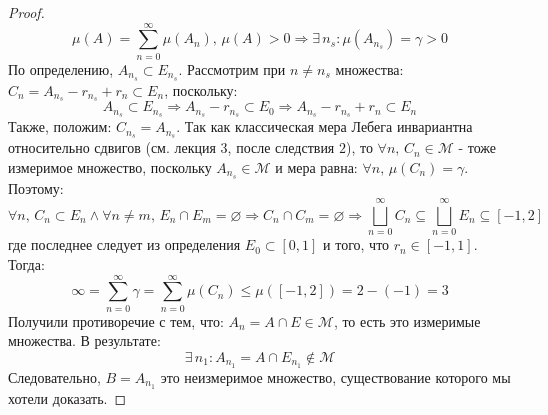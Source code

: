 \documentclass[12pt]{article}
\newcommand{\MM}{\mathcal{M}}
\newcommand{\VN}{\varnothing}
\theoremstyle{definition}
\newcommand{\ddsum}[2]{\displaystyle\sum\limits_{#1}^{#2}}
\begin{document}
\begin{proof}
	$$
		\mu(A) = \ddsum{n = 0}{\infty}\mu(A_n), \, \mu(A) > 0 \Rightarrow \exists \, n_s \colon \mu(A_{n_s}) = \gamma > 0
	$$
	По определению, $A_{n_s} \subset E_{n_s}$. Рассмотрим при $n \neq n_s$ множества: $C_n = A_{n_s} - r_{n_s} + r_n \subset E_n$, поскольку:
	$$
		A_{n_s} \subset E_{n_s} \Rightarrow A_{n_s} - r_{n_s} \subset E_0 \Rightarrow A_{n_s} - r_{n_s} + r_n \subset E_n
	$$
	Также, положим: $C_{n_s} = A_{n_s}$. Так как классическая мера Лебега инвариантна относительно сдвигов (см. лекция $3$, после следствия $2$), то $\forall n,\, C_n \in \MM$ - тоже измеримое множество, поскольку $A_{n_s} \in \MM$ и мера равна: $\forall n, \, \mu(C_n) = \gamma$. Поэтому:
	$$
		\forall n,\, C_n \subset E_n  \wedge \forall n \neq m, \, E_n \cap E_m = \VN \Rightarrow C_n \cap C_m = \VN \Rightarrow \bigsqcup\limits_{n = 0}^{\infty}C_n \subseteq \bigsqcup\limits_{n = 0}^{\infty} E_n \subseteq [-1,2]
	$$
	где последнее следует из определения $E_0 \subset [0,1]$ и того, что $r_n \in [-1,1]$. Тогда:
	$$
		\infty = \ddsum{n = 0}{\infty}\gamma = \ddsum{n = 0}{\infty} \mu(C_n)  \leq \mu([-1,2]) = 2 - (-1) = 3
	$$
	Получили противоречие с тем, что: $A_n = A \cap E \in \MM$, то есть это измеримые множества. В результате:
	$$
		\exists \, n_1 \colon A_{n_1} = A \cap E_{n_1} \not\in \MM 
	$$
	Следовательно, $B = A_{n_1}$ это неизмеримое множество, существование которого мы хотели доказать.
\end{proof}

\newpage
\end{document}
